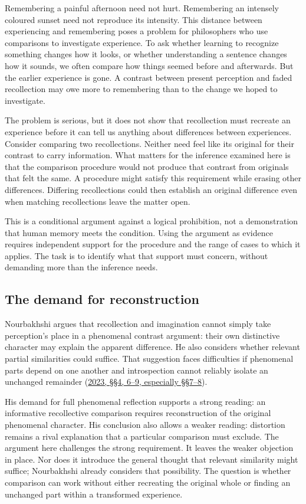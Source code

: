 \noindent Remembering a painful afternoon need not hurt. Remembering an intensely coloured sunset need not reproduce its intensity. This distance between experiencing and remembering poses a problem for philosophers who use comparisons to investigate experience. To ask whether learning to recognize something changes how it looks, or whether understanding a sentence changes how it sounds, we often compare how things seemed before and afterwards. But the earlier experience is gone. A contrast between present perception and faded recollection may owe more to remembering than to the change we hoped to investigate.

The problem is serious, but it does not show that recollection must recreate an experience before it can tell us anything about differences between experiences. Consider comparing two recollections. Neither need feel like its original for their contrast to carry information. What matters for the inference examined here is that the comparison procedure would not produce that contrast from originals that felt the same. A procedure might satisfy this requirement while erasing other differences. Differing recollections could then establish an original difference even when matching recollections leave the matter open.

This is a conditional argument against a logical prohibition, not a demonstration that human memory meets the condition. Using the argument as evidence requires independent support for the procedure and the range of cases to which it applies. The task is to identify what that support must concern, without demanding more than the inference needs.

\subsection*{The demand for reconstruction}

Nourbakhshi argues that recollection and imagination cannot simply take perception's place in a phenomenal contrast argument: their own distinctive character may explain the apparent difference. He also considers whether relevant partial similarities could suffice. That suggestion faces difficulties if phenomenal parts depend on one another and introspection cannot reliably isolate an unchanged remainder (\hyperlink{ref:nourbakhshi2023}{2023, §§4, 6–9, especially §§7–8}).

His demand for full phenomenal reflection supports a strong reading: an informative recollective comparison requires reconstruction of the original phenomenal character. His conclusion also allows a weaker reading: distortion remains a rival explanation that a particular comparison must exclude. The argument here challenges the strong requirement. It leaves the weaker objection in place. Nor does it introduce the general thought that relevant similarity might suffice; Nourbakhshi already considers that possibility. The question is whether comparison can work without either recreating the original whole or finding an unchanged part within a transformed experience.


